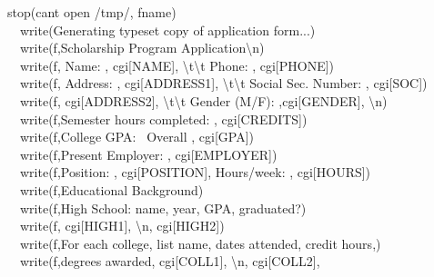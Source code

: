 {{stop({\textquotedbl}can{\textquotesingle}t open /tmp/{\textquotedbl},
fname) \\
\ \ write({\textquotedbl}Generating typeset copy of application
form...{\textquotedbl}) \\
\ \ write(f,{\textquotedbl}Scholarship Program
Application{\textbackslash}n{\textquotedbl}) \\
\ \ write(f, {\textquotedbl}Name: {\textquotedbl},
cgi[{\textquotedbl}NAME{\textquotedbl}],
{\textquotedbl}{\textbackslash}t{\textbackslash}t Phone:
{\textquotedbl}, cgi[{\textquotedbl}PHONE{\textquotedbl}]) \\
\ \ write(f, {\textquotedbl}Address: {\textquotedbl},
cgi[{\textquotedbl}ADDRESS1{\textquotedbl}], {\textquotedbl}
{\textbackslash}t{\textbackslash}t Social Sec. Number: {\textquotedbl},
cgi[{\textquotedbl}SOC{\textquotedbl}]) \\
\ \ write(f, cgi[{\textquotedbl}ADDRESS2{\textquotedbl}],
{\textquotedbl} {\textbackslash}t{\textbackslash}t Gender (M/F):
{\textquotedbl},cgi[{\textquotedbl}GENDER{\textquotedbl}],
{\textquotedbl}{\textbackslash}n{\textquotedbl}) \\
\ \ write(f,{\textquotedbl}Semester hours completed: {\textquotedbl},
cgi[{\textquotedbl}CREDITS{\textquotedbl}]) \\
\ \ write(f,{\textquotedbl}College GPA: \ Overall {\textquotedbl},
cgi[{\textquotedbl}GPA{\textquotedbl}]) \\
\ \ write(f,{\textquotedbl}Present Employer: {\textquotedbl},
cgi[{\textquotedbl}EMPLOYER{\textquotedbl}]) \\
\ \ write(f,{\textquotedbl}Position: {\textquotedbl},
cgi[{\textquotedbl}POSITION{\textquotedbl}], {\textquotedbl}
Hours/week: {\textquotedbl}, cgi[{\textquotedbl}HOURS{\textquotedbl}]) \\
\ \ write(f,{\textquotedbl}Educational Background{\textquotedbl}) \\
\ \ write(f,{\textquotedbl}High School: name, year, GPA,
		graduated?{\textquotedbl}) \\
\ \ write(f, cgi[{\textquotedbl}HIGH1{\textquotedbl}],
{\textquotedbl}{\textbackslash}n{\textquotedbl},
cgi[{\textquotedbl}HIGH2{\textquotedbl}]) \\
\ \ write(f,{\textquotedbl}For each college, list name, dates attended,
credit hours,{\textquotedbl}) \\
\ \ write(f,{\textquotedbl}degrees awarded{\textquotedbl}, cgi[{\textquotedbl}COLL1{\textquotedbl}],
{\textquotedbl}{\textbackslash}n{\textquotedbl},
cgi[{\textquotedbl}COLL2{\textquotedbl}],
}}
